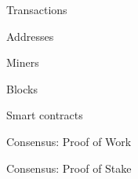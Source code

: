 
\begin{frame}{Transactions}

\end{frame}

\begin{frame}{Addresses}

\end{frame}

\begin{frame}{Miners}

\end{frame}

\begin{frame}{Blocks}

\end{frame}

\begin{frame}{Smart contracts}

\end{frame}

\begin{frame}{Consensus: Proof of Work}

\end{frame}

\begin{frame}{Consensus: Proof of Stake}

\end{frame}